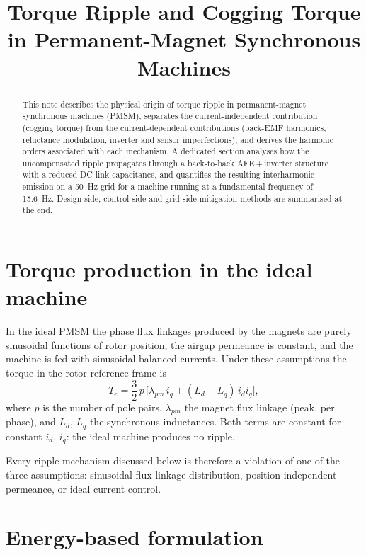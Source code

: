 \documentclass[11pt,a4paper]{article}
\title{Torque Ripple and Cogging Torque in Permanent-Magnet Synchronous Machines}
\author{}
\date{}
\begin{document}
\maketitle

\begin{abstract}
This note describes the physical origin of torque ripple in permanent-magnet
synchronous machines (PMSM), separates the current-independent contribution
(cogging torque) from the current-dependent contributions (back-EMF harmonics,
reluctance modulation, inverter and sensor imperfections), and derives the
harmonic orders associated with each mechanism. A dedicated section analyses how
the uncompensated ripple propagates through a back-to-back AFE\,+\,inverter
structure with a reduced DC-link capacitance, and quantifies the resulting
interharmonic emission on a \SI{50}{\hertz} grid for a machine running at a
fundamental frequency of \SI{15.6}{\hertz}. Design-side, control-side and
grid-side mitigation methods are summarised at the end.
\end{abstract}

\section{Torque production in the ideal machine}

In the ideal PMSM the phase flux linkages produced by the magnets are purely
sinusoidal functions of rotor position, the airgap permeance is constant, and
the machine is fed with sinusoidal balanced currents. Under these assumptions
the torque in the rotor reference frame is
\begin{equation}
T_{e} = \frac{3}{2}\,p\,\Big[\lambda_{pm}\,i_{q} + (L_{d}-L_{q})\,i_{d}i_{q}\Big],
\label{eq:ideal}
\end{equation}
where $p$ is the number of pole pairs, $\lambda_{pm}$ the magnet flux linkage
(peak, per phase), and $L_d$, $L_q$ the synchronous inductances. Both terms are
constant for constant $i_d$, $i_q$: the ideal machine produces no ripple.

Every ripple mechanism discussed below is therefore a violation of one of the
three assumptions: sinusoidal flux-linkage distribution, position-independent
permeance, or ideal current control.

\section{Energy-based formulation}
\end{document}
